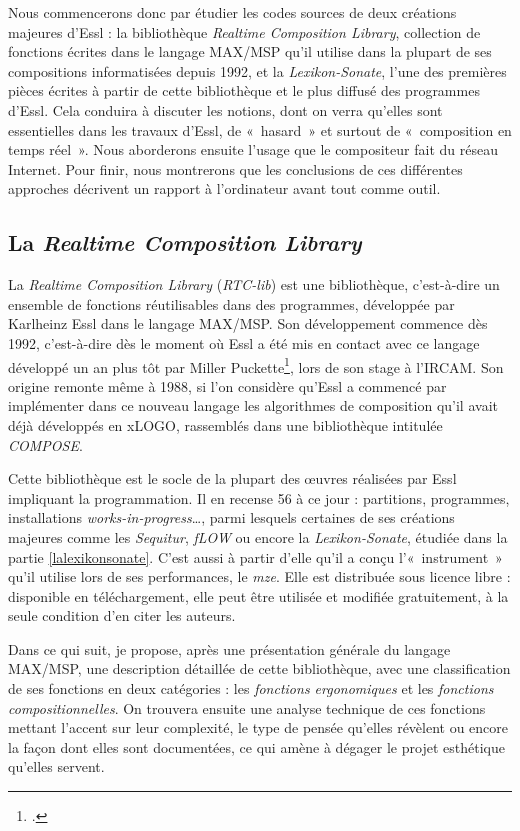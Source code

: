 \documentclass[a4paper,12pt]{article}
\newcommand{\guill}[1]{«~#1~»}
\newcommand{\maze}[0]{\emph{m\symbol{64}ze\textdegree2}}
\begin{document}
Nous commencerons donc par étudier les codes sources de deux créations majeures d'Essl : la bibliothèque \emph{Realtime Composition Library}, collection de fonctions écrites dans le langage MAX/MSP qu'il utilise dans la plupart de ses compositions informatisées depuis 1992, et la \emph{Lexikon-Sonate}, l'une des premières pièces écrites à partir de cette bibliothèque et le plus diffusé des programmes d'Essl. Cela conduira à discuter les notions, dont on verra qu'elles sont essentielles dans les travaux d'Essl, de \guill{hasard} et surtout de \guill{composition en temps réel}. Nous aborderons ensuite l'usage que le compositeur fait du réseau Internet. Pour finir, nous montrerons que les conclusions de ces différentes approches décrivent un rapport à l'ordinateur avant tout comme outil.


\subsection{La \emph{Realtime Composition Library}}
\label{rtclib}

La \emph{Realtime Composition Library} (\emph{RTC-lib}) est une bibliothèque, c'est-à-dire un ensemble de fonctions réutilisables dans des programmes, développée par Karlheinz Essl dans le langage MAX/MSP. Son développement commence dès 1992, c'est-à-dire dès le moment où Essl a été mis en contact avec ce langage développé un an plus tôt par Miller Puckette\footnote{\cite{puckette1991combining}.}, lors de son stage à l'IRCAM. Son origine remonte même à 1988, si l'on considère qu'Essl a commencé par implémenter dans ce nouveau langage les algorithmes de composition qu'il avait déjà développés en xLOGO, rassemblés dans une bibliothèque intitulée \emph{COMPOSE}.

Cette bibliothèque est le socle de la plupart des œuvres réalisées par Essl impliquant la programmation. Il en recense 56 à ce jour : partitions, programmes, installations \emph{works-in-progress}\dots, parmi lesquels certaines de ses créations majeures comme les \emph{Sequitur}, \emph{fLOW} ou encore la \emph{Lexikon-Sonate}, étudiée dans la partie \ref{lalexikonsonate}. C'est aussi à partir d'elle qu'il a conçu l'\guill{instrument} qu'il utilise lors de ses performances, le \maze. Elle est distribuée sous licence libre : disponible en téléchargement, elle peut être utilisée et modifiée gratuitement, à la seule condition d'en citer les auteurs.

Dans ce qui suit, je propose, après une présentation générale du langage MAX/MSP, une description détaillée de cette bibliothèque, avec une classification de ses fonctions en deux catégories : les \emph{fonctions ergonomiques} et les \emph{fonctions compositionnelles}. On trouvera ensuite une analyse technique de ces fonctions mettant l'accent sur leur complexité, le type de pensée qu'elles révèlent ou encore la façon dont elles sont documentées, ce qui amène à dégager le projet esthétique qu'elles servent.
\end{document}
